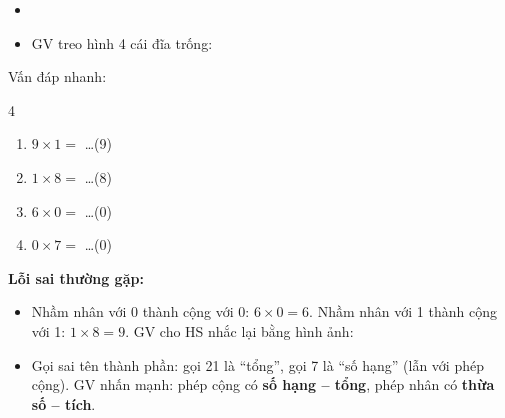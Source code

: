 \documentclass[../main.tex]{subfiles}
\begin{document}
\begin{itemize}
    \item {} 
    \item GV treo hình 4 cái đĩa trống:  
\end{itemize}
\begin{vd}
    Vấn đáp nhanh:
    \begin{multicols}{4}
    \begin{enumerate}
        \item $9 \times 1 =$ \dots \hfill (9)
        \item $1 \times 8 =$ \dots \hfill (8)
        \item $6 \times 0 =$ \dots \hfill (0)
        \item $0 \times 7 =$ \dots \hfill (0)
    \end{enumerate}
    \end{multicols}
\end{vd}
\begin{luuy}
    \textbf{Lỗi sai thường gặp:}
    \begin{itemize}
        \item Nhầm nhân với 0 thành cộng với 0: $6 \times 0 = 6$. Nhầm nhân với 1 thành cộng với 1: $1 \times 8 = 9$. GV cho HS nhắc lại bằng hình ảnh: 
        \item Gọi sai tên thành phần: gọi 21 là “tổng”, gọi 7 là “số hạng” (lẫn với phép cộng). GV nhấn mạnh: phép cộng có \textbf{số hạng -- tổng}, phép nhân có \textbf{thừa số -- tích}.
    \end{itemize}
\end{luuy}

\newpage
\end{document}
